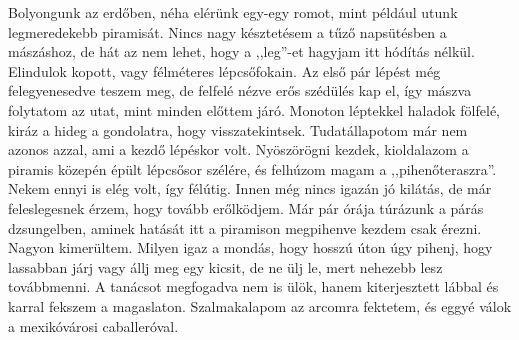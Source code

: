 Bolyongunk az erdőben, néha elérünk egy-egy romot, mint például
utunk legmeredekebb piramisát. Nincs nagy késztetésem a tűző napsütésben
a mászáshoz, de hát az nem lehet, hogy a ,,leg''-et hagyjam itt
hódítás nélkül. Elindulok kopott, vagy félméteres lépcsőfokain. Az első
pár lépést még felegyenesedve teszem meg, de felfelé nézve erős szédülés
kap el, így mászva folytatom az utat, mint minden előttem járó.
Monoton léptekkel haladok fölfelé, kiráz a hideg a gondolatra, hogy
visszatekintsek. Tudatállapotom már nem azonos azzal, ami a kezdő
lépéskor volt. Nyöszörögni kezdek, kioldalazom a piramis közepén
épült lépcsősor szélére, és felhúzom magam a ,,pihenőteraszra''. Nekem
ennyi is elég volt, így félútig. Innen még nincs igazán jó kilátás, de már
feleslegesnek érzem, hogy tovább erőlködjem. Már pár órája túrázunk a
párás dzsungelben, aminek hatását itt a piramison megpihenve kezdem
csak érezni. Nagyon kimerültem. Milyen igaz a mondás, hogy hosszú
úton úgy pihenj, hogy lassabban járj vagy állj meg egy kicsit, de ne ülj le,
mert nehezebb lesz továbbmenni. A tanácsot megfogadva nem is ülök,
hanem kiterjesztett lábbal és karral fekszem a magaslaton. Szalmakalapom
az arcomra fektetem, és eggyé válok a mexikóvárosi caballeróval.


